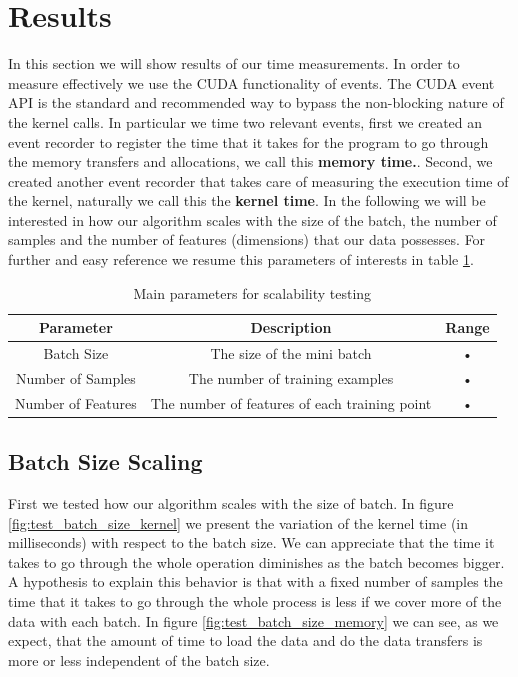 \documentclass[11pt,a4paper]{article}
\begin{document}
\section{Results}
In this section we will show results of our time measurements. In order to measure effectively we
use the CUDA functionality of events. The CUDA event API is the standard and recommended way to 
bypass the non-blocking  nature of the kernel calls. 
In particular we time two relevant events, first we created an event recorder to 
register the time that it takes for the program to go through the memory transfers 
and allocations, we call this \textbf{memory time.}. Second, we created another event
recorder that takes care of measuring the execution time of the kernel, naturally we 
call this the \textbf{kernel time}. In the following we will be interested in how our 
algorithm scales with the size of the batch, the number of samples and the number 
of features (dimensions) that our data possesses. For further and easy 
reference we resume this parameters of interests in table \ref{table:parameters}.


\begin{table}[H]
\centering
\begin{tabular}{|c|c|c|}
\hline
Parameter & Description & Range \\
\hline
Batch Size & The size of the mini batch & • \\
\hline
Number of Samples & The number of training examples & • \\
\hline
Number of Features & The number of features of each training point & • \\
\hline
\end{tabular}
\caption{Main parameters for scalability testing}
\label{table:parameters}
\end{table}

\subsection{Batch Size Scaling}

First we tested how our algorithm scales with the size of batch. In figure \ref{fig:test_batch_size_kernel} we present the variation of the kernel time (in milliseconds) with respect to the batch size. We can appreciate that the time it takes to go through the whole operation diminishes as the batch becomes bigger. A hypothesis to explain this behavior is that with a fixed number of samples the time that it takes to go through the whole process is less if we cover more of the data with each batch. In figure \ref{fig:test_batch_size_memory} we can see, as we expect, that the amount of time to load the data and do the data transfers is more or less independent of the batch size. 
\end{document}
